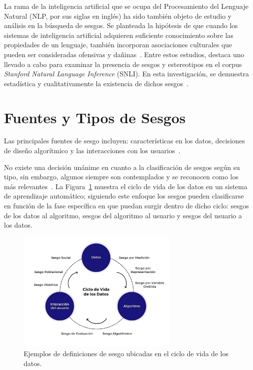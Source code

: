     La rama de la inteligencia artificial que se ocupa del Procesamiento del Lenguaje Natural (NLP, por sus siglas en ingl\'es) ha sido 
    tambi\'en objeto de estudio y an\'alisis en la b\'usqueda de sesgos. Se planteada la hip\'otesis de que cuando los sistemas de inteligencia
    artificial adquieren suficiente conocimiento sobre las propiedades de un lenguaje, tambi\'en incorporan 
    asociaciones culturales que pueden ser consideradas ofensivas y da\~ninas~\parencite{Caliskan_2017}. Entre estos estudios, 
    destaca uno llevado a cabo para examinar la presencia de sesgos y estereotipos en el corpus 
    \emph{Stanford Natural Language Inference} (SNLI). En esta investigaci\'on, se demuestra estad\'istica y cualitativamente 
    la existencia de dichos sesgos~\parencite{rudinger-etal-2017-social}.
    
    


\section{Fuentes y Tipos de Sesgos}

    Las principales fuentes de sesgo incluyen: caracter\'isticas en los datos, decisiones de dise\~no algor\'itmico y las interacciones 
    con los usuarios~\parencite{resp_data}.
    
    No existe una decisi\'on un\'anime en cuanto a la clasificaci\'on de sesgos seg\'un su tipo, sin embargo, 
    algunos siempre son contemplados y se reconocen como los m\'as relevantes~\parencite{survey}. La Figura~\ref{fig:cycle} 
    muestra el ciclo de vida de los datos en un sistema de aprendizaje autom\'atico; siguiendo este enfoque los sesgos pueden 
    clasificarse en funci\'on de la fase espec\'ifica en que puedan surgir dentro de dicho ciclo: 
    sesgos de los datos al algoritmo, sesgos del algoritmo al usuario y sesgos del usuario a los datos.

    \begin{figure}[htpb]
        \begin{center}
            \includegraphics[width=0.7\textwidth]{Graphics/data_cycle.png}
        \end{center}
        \caption{Ejemplos de definiciones de sesgo ubicadas en el ciclo de vida de los datos.}
        \label{fig:cycle}
    \end{figure}
    


